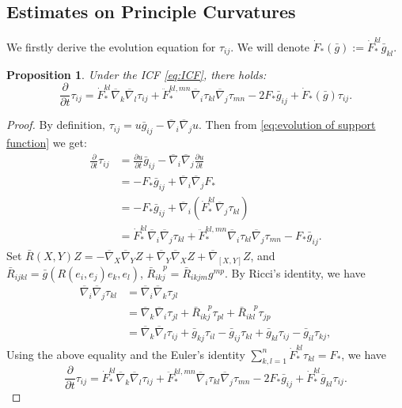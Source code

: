 \documentclass[10pt,a4paper]{amsart}
\newtheorem{proposition}[theorem]{Proposition}
\newcommand{\pd}[2]{\frac{\partial {#1}}{\partial {#2}}}
\newcommand{\bnabla}{\overline{\nabla}}
\newcommand{\bg}{\bar{g}}
\numberwithin{equation}{section}
\begin{document}
\subsection{Estimates on Principle Curvatures}
We firstly derive the evolution equation for \(\tau_{ij}\). We will denote \(\dot{F}_* (\bg) := \dot{F}_*^{kl}\bg_{kl}\). 
\begin{proposition}
    Under the ICF \eqref{eq:ICF}, there holds:
    \begin{equation}\label{eq:evolution of radii}
        \pd{}{t}\tau_{ij} = \dot{F}_*^{kl}\bnabla_k \bnabla_l \tau_{ij} + \ddot{F}_*^{kl,mn}\bnabla_i \tau_{kl}\bnabla_j \tau_{mn} - 2F_* \bg_{ij} + \dot{F}_*(\bg)\tau_{ij}.
    \end{equation}
\end{proposition}
\begin{proof}
    By definition, \(\tau_{ij} = u\bg_{ij} - \bnabla_i \bnabla_j u\). Then from \eqref{eq:evolution of support function} we get: 
    \[ \begin{aligned}
        \pd{}{t}\tau_{ij} &= \pd{u}{t}\bg_{ij} - \bnabla_i \bnabla_j \pd{u}{t} \\
        &= -F_* \bg_{ij} + \bnabla_i \bnabla_j F_* \\
        &= -F_* \bg_{ij} + \bnabla_i \left(\dot{F}_*^{kl}\bnabla_j \tau_{kl} \right) \\
        &= \dot{F}_*^{kl}\bnabla_i \bnabla_j \tau_{kl} + \ddot{F}_*^{kl,mn}\bnabla_i \tau_{kl} \bnabla_j \tau_{mn} - F_* \bg_{ij}.
    \end{aligned}
    \]
     Set \(\bar{R}(X,Y)Z = -\bnabla_X\bnabla_Y Z + \bnabla_Y\bnabla_X Z + \bnabla_{[X,Y]}Z\), and \(\bar{R}_{ijkl} = \bg(R(e_i,e_j)e_k,e_l)\), \( \bar{R}_{ikj}^{\quad p} = \bar{R}_{ikjm}g^{mp} \). By Ricci's identity, we have
    \[ \begin{aligned}
        \bnabla_i \bnabla_j \tau_{kl} &= \bnabla_i \bnabla_k \tau_{jl} \\
        &= \bnabla_k \bnabla_i \tau_{jl} + \bar{R}_{ikj}^{\quad p}\tau_{pl} + \bar{R}_{ikl}^{\quad p}\tau_{jp}\\
        &= \bnabla_k \bnabla_l \tau_{ij} + \bg_{kj}\tau_{il} - \bg_{ij}\tau_{kl} + \bg_{kl}\tau_{ij} - \bg_{il}\tau_{kj},
    \end{aligned} \]
    Using the above equality and the Euler's identity \(\sum_{k,l=1}^{n}\dot{F}_*^{kl}\tau_{kl} = F_*\), we have 
    \[ \pd{}{t}\tau_{ij} = \dot{F}_*^{kl}\bnabla_k \bnabla_l \tau_{ij} + \ddot{F}_*^{kl,mn}\bnabla_i \tau_{kl}\bnabla_j \tau_{mn} - 2F_* \bg_{ij} + \dot{F}_*^{kl}\bg_{kl}\tau_{ij}. \]
\end{proof}
\end{document}
